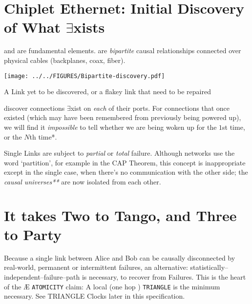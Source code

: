 \documentclass[../HFT-main.tex]{subfiles}
\begin{document}
\clearpage


\section{Chiplet Ethernet: Initial Discovery of What $\exists$xists}

\CELLs and \LINKs are  fundamental elements. \LINKs are \emph{bipartite} causal relationships connected over physical cables (backplanes, coax, fiber). 

 \begin{marginfigure}
        \texttt{[image: ../../FIGURES/Bipartite-discovery.pdf]}
  \caption{A Link yet to be discovered, or a flakey link that need to be repaired}
      \vspace{12pt}
\end{marginfigure}


\CELLs discover connections $\exists$xist on \emph{each} of their ports. For connections that  once existed (which may have been remembered from previously being powered up), we will find it \emph{impossible} to tell whether we are being woken up for the $1$st time, or the $N$th time*. 

Single Links are subject to \emph{partial} or \emph{total} failure. Although networks use the word  `partition', for example in the CAP Theorem\cite{CAP}, this concept is inappropriate except in the single \LINK case, when there's no communication with the other side; the  \emph{causal %
 universes**} are now isolated from each other.
 
\section{It takes Two to Tango, and Three to Party}


Because a single link between Alice and Bob can be causally disconnected by real-world, permanent or intermittent failures, an alternative: statistically--independent--failure--path is necessary, to recover from \LINK Failures.  %
This is the heart of the  Æ \texttt{ATOMICITY} claim:   A local (one hop \LINK) \texttt{TRIANGLE}  is the minimum necessary.  See TRIANGLE Clocks later in this specification.
\end{document}
